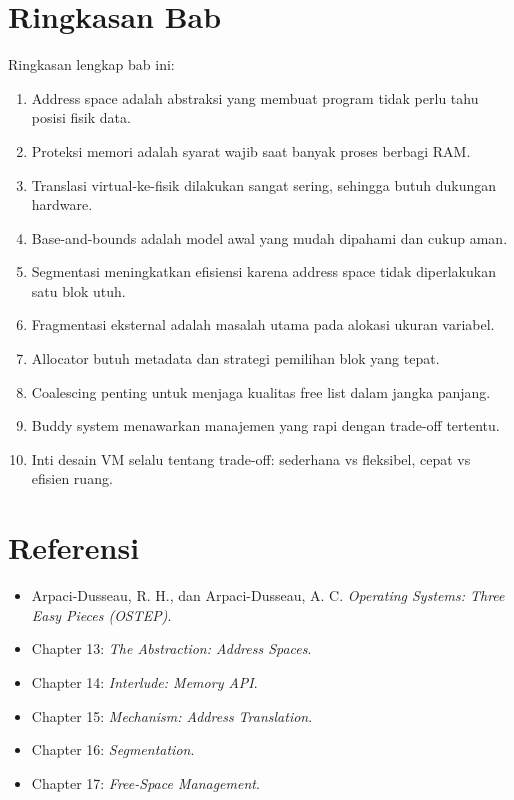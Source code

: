 \section{Ringkasan Bab}
Ringkasan lengkap bab ini:
\begin{enumerate}
    \item Address space adalah abstraksi yang membuat program tidak perlu tahu posisi fisik data.
    \item Proteksi memori adalah syarat wajib saat banyak proses berbagi RAM.
    \item Translasi virtual-ke-fisik dilakukan sangat sering, sehingga butuh dukungan hardware.
    \item Base-and-bounds adalah model awal yang mudah dipahami dan cukup aman.
    \item Segmentasi meningkatkan efisiensi karena address space tidak diperlakukan satu blok utuh.
    \item Fragmentasi eksternal adalah masalah utama pada alokasi ukuran variabel.
    \item Allocator butuh metadata dan strategi pemilihan blok yang tepat.
    \item Coalescing penting untuk menjaga kualitas free list dalam jangka panjang.
    \item Buddy system menawarkan manajemen yang rapi dengan trade-off tertentu.
    \item Inti desain VM selalu tentang trade-off: sederhana vs fleksibel, cepat vs efisien ruang.
\end{enumerate}

\section*{Referensi}
\begin{itemize}
    \item Arpaci-Dusseau, R. H., dan Arpaci-Dusseau, A. C. \textit{Operating Systems: Three Easy Pieces (OSTEP)}.
    \item Chapter 13: \textit{The Abstraction: Address Spaces}.
    \item Chapter 14: \textit{Interlude: Memory API}.
    \item Chapter 15: \textit{Mechanism: Address Translation}.
    \item Chapter 16: \textit{Segmentation}.
    \item Chapter 17: \textit{Free-Space Management}.
\end{itemize}

